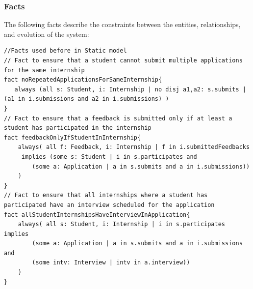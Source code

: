 \subsubsection{Facts}
The following facts describe the constraints between the entities, relationships, and evolution of the system:
\begin{lstlisting}
//Facts used before in Static model 
// Fact to ensure that a student cannot submit multiple applications for the same internship
fact noRepeatedApplicationsForSameInternship{
   always (all s: Student, i: Internship | no disj a1,a2: s.submits | (a1 in i.submissions and a2 in i.submissions) )
}
// Fact to ensure that a feedback is submitted only if at least a student has participated in the internship
fact feedbackOnlyIfStudentInInternship{
    always( all f: Feedback, i: Internship | f in i.submittedFeedbacks 
     implies (some s: Student | i in s.participates and 
        (some a: Application | a in s.submits and a in i.submissions))
    )
}
// Fact to ensure that all internships where a student has participated have an interview scheduled for the application
fact allStudentInternshipsHaveInterviewInApplication{
    always( all s: Student, i: Internship | i in s.participates implies 
        (some a: Application | a in s.submits and a in i.submissions and
        (some intv: Interview | intv in a.interview))
    )
}


\end{lstlisting}
